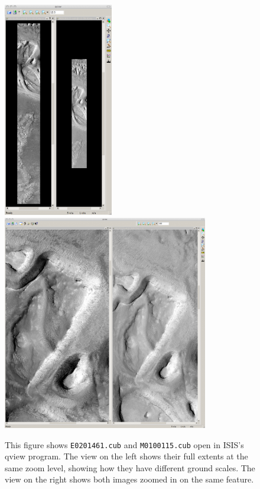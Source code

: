 \begin{figure}[t!]
\begin{minipage}{5.2in}
\includegraphics[height=3.7in]{images/p19-images.png}
\hfill
\includegraphics[height=3.7in]{images/p19-images_zoom.png}
\end{minipage}
\hfill
\begin{minipage}{1.3in}
\caption[P19 images open in qview zoomed in]{
    \label{p19-images}
    This figure shows \texttt{E0201461.cub} and \texttt{M0100115.cub}
    open in ISIS's qview program.  The view on the left shows their
    full extents at the same zoom level, showing how they have
    different ground scales.  The view on the right shows both images
    zoomed in on the same feature.  }
\end{minipage}
\end{figure}

